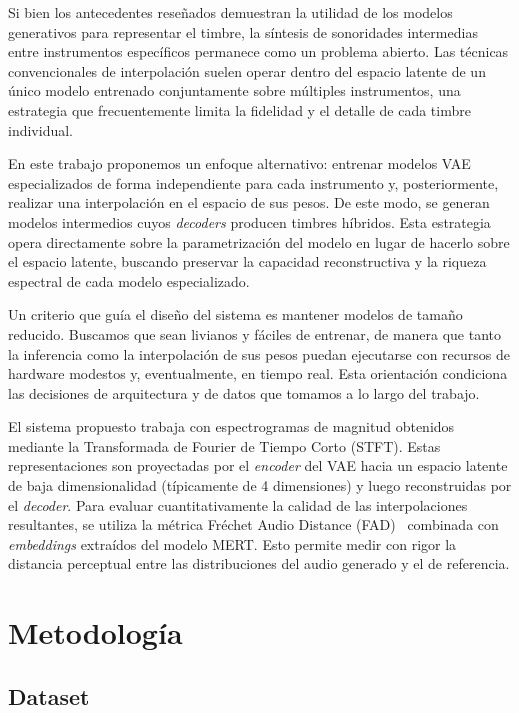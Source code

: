 \documentclass[12pt,a4paper,twoside]{tesis}
\begin{document}
Si bien los antecedentes reseñados demuestran la utilidad de los modelos generativos para representar el timbre, la síntesis de sonoridades intermedias entre instrumentos específicos permanece como un problema abierto. Las técnicas convencionales de interpolación suelen operar dentro del espacio latente de un único modelo entrenado conjuntamente sobre múltiples instrumentos, una estrategia que frecuentemente limita la fidelidad y el detalle de cada timbre individual.

En este trabajo proponemos un enfoque alternativo: entrenar modelos VAE especializados de forma independiente para cada instrumento y, posteriormente, realizar una interpolación en el espacio de sus pesos. De este modo, se generan modelos intermedios cuyos \textit{decoders} producen timbres híbridos. Esta estrategia opera directamente sobre la parametrización del modelo en lugar de hacerlo sobre el espacio latente, buscando preservar la capacidad reconstructiva y la riqueza espectral de cada modelo especializado.

Un criterio que guía el diseño del sistema es mantener modelos de tamaño reducido. Buscamos que sean livianos y fáciles de entrenar, de manera que tanto la inferencia como la interpolación de sus pesos puedan ejecutarse con recursos de hardware modestos y, eventualmente, en tiempo real. Esta orientación condiciona las decisiones de arquitectura y de datos que tomamos a lo largo del trabajo.

El sistema propuesto trabaja con espectrogramas de magnitud obtenidos mediante la Transformada de Fourier de Tiempo Corto (STFT). Estas representaciones son proyectadas por el \textit{encoder} del VAE hacia un espacio latente de baja dimensionalidad (típicamente de 4 dimensiones) y luego reconstruidas por el \textit{decoder}. Para evaluar cuantitativamente la calidad de las interpolaciones resultantes, se utiliza la métrica Fréchet Audio Distance (FAD)~\cite{gui2024adaptingfrechetaudiodistance} combinada con \textit{embeddings} extraídos del modelo MERT. Esto permite medir con rigor la distancia perceptual entre las distribuciones del audio generado y el de referencia.

\chapter{Metodología}
\label{cap:metodologia}

\section{Dataset}
\end{document}
